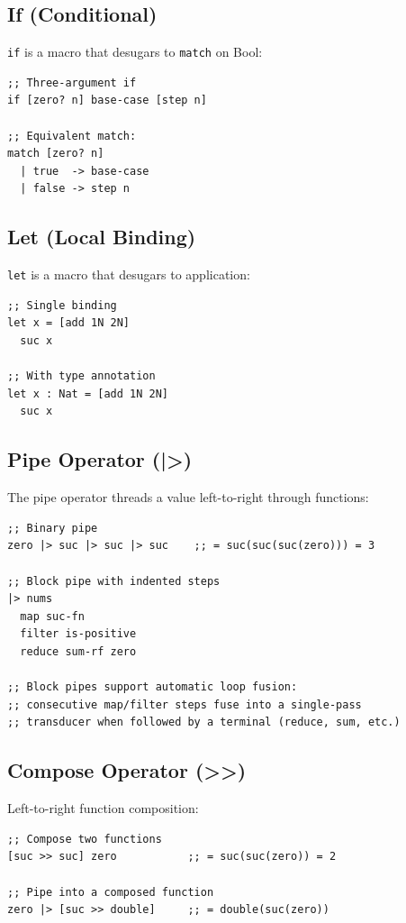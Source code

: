 \documentclass[11pt]{article}
\begin{document}
\subsection{If (Conditional)}
\label{sec:org7d54272}

\texttt{if} is a macro that desugars to \texttt{match} on Bool:

\begin{verbatim}
;; Three-argument if
if [zero? n] base-case [step n]

;; Equivalent match:
match [zero? n]
  | true  -> base-case
  | false -> step n
\end{verbatim}
\subsection{Let (Local Binding)}
\label{sec:org93a96ed}

\texttt{let} is a macro that desugars to application:

\begin{verbatim}
;; Single binding
let x = [add 1N 2N]
  suc x

;; With type annotation
let x : Nat = [add 1N 2N]
  suc x
\end{verbatim}
\subsection{Pipe Operator (|>)}
\label{sec:org9a213fd}

The pipe operator threads a value left-to-right through functions:

\begin{verbatim}
;; Binary pipe
zero |> suc |> suc |> suc    ;; = suc(suc(suc(zero))) = 3

;; Block pipe with indented steps
|> nums
  map suc-fn
  filter is-positive
  reduce sum-rf zero

;; Block pipes support automatic loop fusion:
;; consecutive map/filter steps fuse into a single-pass
;; transducer when followed by a terminal (reduce, sum, etc.)
\end{verbatim}
\subsection{Compose Operator (>>)}
\label{sec:org139da18}

Left-to-right function composition:

\begin{verbatim}
;; Compose two functions
[suc >> suc] zero           ;; = suc(suc(zero)) = 2

;; Pipe into a composed function
zero |> [suc >> double]     ;; = double(suc(zero))
\end{verbatim}
\end{document}
